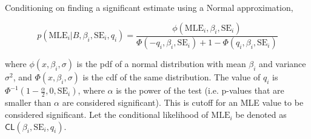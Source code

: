 \documentclass[AMA,STIX1COL]{WileyNJD-v2}\usepackage[]{graphicx}\usepackage[]{color}
\begin{document}
Conditioning on finding a significant estimate using a Normal approximation, 

\begin{equation}\label{eq5}
p(\text{MLE}_i | B,\beta_i,\text{SE}_i,q_i) = \frac{\phi(\text{MLE}_i, \beta_i, \text{SE}_i)}{\Phi(-q_i, \beta_i, \text{SE}_i)+1-\Phi(q_i, \beta_i, \text{SE}_i)}
\end{equation}

where $\phi(x, \beta_i, \sigma)$ is the pdf of a normal distribution with mean $\beta_i$ and variance $\sigma^2$, and $\Phi(x, \beta_i, \sigma)$ is the cdf of the same distribution. The value of $q_i$ is $\Phi^{-1}(1-\frac{\alpha}{2}, 0 ,\text{SE}_i)$, where $\alpha$ is the power of the test (i.e. p-values that are smaller than $\alpha$ are considered significant). This is cutoff for an MLE value to be considered significant. Let the conditional likelihood of $\text{MLE}_i$  be denoted as $\textsf{CL}(\beta_i,\text{SE}_i, q_i)$.
\end{document}
